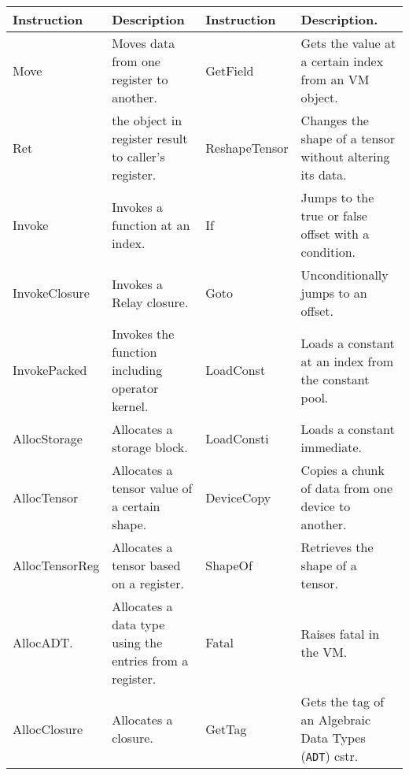     \begin{tabular}{@{}p{}p{}p{}p{}@{}}
    \toprule
    Instruction    & Description                                                  & Instruction   & Description.                                            \\ \midrule
    Move           & Moves data from one register to another.                     & GetField      & Gets the value at a certain index from an VM object.          \\
    Ret            & the object in register result to caller's register.          & ReshapeTensor & Changes the shape of a tensor without altering its data.      \\
    Invoke         & Invokes a function at an index.                              & If            & Jumps to the true or false offset with a condition.           \\
    InvokeClosure  & Invokes a Relay closure.                                     & Goto          & Unconditionally jumps to an offset.                           \\
    InvokePacked   & Invokes the function including operator kernel.              & LoadConst     & Loads a constant at an index from the constant pool.          \\
    AllocStorage   & Allocates a storage block.                                   & LoadConsti    & Loads a constant immediate.                                   \\
    AllocTensor    & Allocates a tensor value of a certain shape.                 & DeviceCopy    & Copies a chunk of data from one device to another.              \\
    AllocTensorReg & Allocates a tensor based on a register.                      & ShapeOf       & Retrieves the shape of a tensor.                               \\
    AllocADT.      & Allocates a data type using the entries from a register.     & Fatal         & Raises fatal in the VM.                                       \\
    AllocClosure   & Allocates a closure. & GetTag        & Gets the tag of an Algebraic Data Types (\texttt{ADT}) cstr.       \\
    \bottomrule
    \end{tabular}
